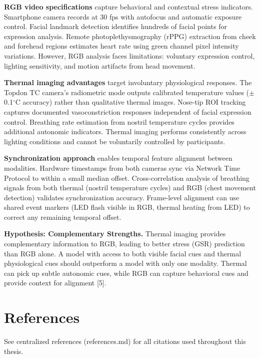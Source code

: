 \textbf{RGB video specifications} capture behavioral and contextual stress indicators. Smartphone camera records at 30 fps with autofocus and automatic exposure control. Facial landmark detection identifies hundreds of facial points for expression analysis. Remote photoplethysmography (rPPG) extraction from cheek and forehead regions estimates heart rate using green channel pixel intensity variations. However, RGB analysis faces limitations: voluntary expression control, lighting sensitivity, and motion artifacts from head movement.

\textbf{Thermal imaging advantages} target involuntary physiological responses. The Topdon TC camera's radiometric mode outputs calibrated temperature values ($\pm$0.1$^\circ$C accuracy) rather than qualitative thermal images. Nose-tip ROI tracking captures documented vasoconstriction responses independent of facial expression control. Breathing rate estimation from nostril temperature cycles provides additional autonomic indicators. Thermal imaging performs consistently across lighting conditions and cannot be voluntarily controlled by participants.

\textbf{Synchronization approach} enables temporal feature alignment between modalities. Hardware timestamps from both cameras sync via Network Time Protocol to within a small median offset. Cross-correlation analysis of breathing signals from both thermal (nostril temperature cycles) and RGB (chest movement detection) validates synchronization accuracy. Frame-level alignment can use shared event markers (LED flash visible in RGB, thermal heating from LED) to correct any remaining temporal offset.

\textbf{Hypothesis: Complementary Strengths.} Thermal imaging provides complementary information to RGB, leading to better stress (GSR) prediction than RGB alone. A model with access to both visible facial cues and thermal physiological cues should outperform a model with only one modality. Thermal can pick up subtle autonomic cues, while RGB can capture behavioral cues and provide context for alignment [5].

\section*{References}
See centralized references (references.md) for all citations used throughout this thesis.
